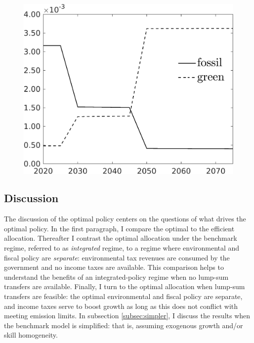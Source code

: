 \begin{figure}[h!!]
\begin{minipage}[]{0.32\textwidth}
		\includegraphics[width=1\textwidth]{../../codding_model/own_basedOnFried/optimalPol_190722_tidiedUp/figures/all_July22/SingleJointTOT_regime3_OPT_T_NoTaus_LabourInp_spillover0_noskill0_sep1_xgrowth0_extern0_etaa0.79_lgd1.png}
	\end{minipage}
\end{figure} 



\subsection{Discussion}\label{subsec:dis}
The discussion of the optimal policy centers on the questions of what drives the optimal policy. In the first paragraph, I compare the optimal to the efficient allocation. Thereafter I contrast the optimal allocation under the benchmark regime, referred to as \textit{integrated} regime, to a regime where environmental and fiscal policy are \textit{separate}: environmental tax revenues are consumed by the government and no income taxes are available. This comparison helps to understand the benefits of an integrated-policy regime when no lump-sum transfers are available. Finally, I turn to the optimal allocation when lump-sum transfers are feasible: the optimal environmental and fiscal policy are separate, and income taxes serve to boost growth as long as this does not conflict with meeting emission limits.
In subsection \ref{subsec:simpler}, I discuss the results when the benchmark model is simplified: that is, assuming exogenous growth and/or skill homogeneity.

